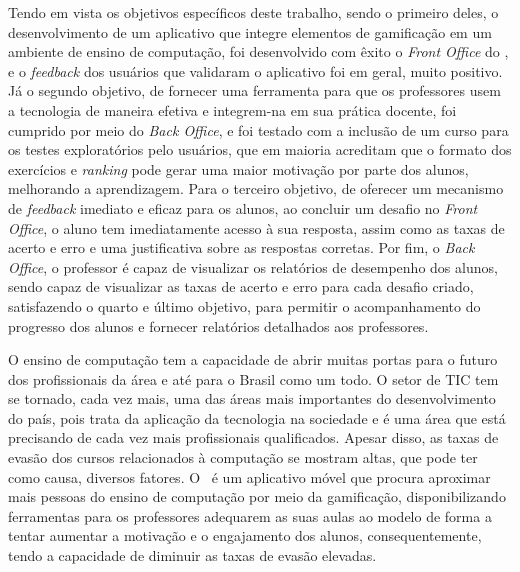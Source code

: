 Tendo em vista os objetivos específicos deste trabalho, sendo o primeiro deles, o desenvolvimento de um aplicativo que integre elementos de gamificação em um ambiente de ensino de computação, foi desenvolvido com êxito o \textit{Front Office} do \appName, e o \textit{feedback} dos usuários que validaram o aplicativo foi em geral, muito positivo. Já o segundo objetivo, de fornecer uma ferramenta para que os professores usem a tecnologia de maneira efetiva e integrem-na em sua prática docente, foi cumprido por meio do \textit{Back Office}, e foi testado com a inclusão de um curso para os testes exploratórios pelo usuários, que em maioria acreditam que o formato dos exercícios e \textit{ranking} pode gerar uma maior motivação por parte dos alunos, melhorando a aprendizagem. Para o terceiro objetivo, de oferecer um mecanismo de \textit{feedback} imediato e eficaz para os alunos, ao concluir um desafio no \textit{Front Office}, o aluno tem imediatamente acesso à sua resposta, assim como as taxas de acerto e erro e uma justificativa sobre as respostas corretas. Por fim, o \textit{Back Office}, o professor é capaz de visualizar os relatórios de desempenho dos alunos, sendo capaz de visualizar as taxas de acerto e erro para cada desafio criado, satisfazendo o quarto e último objetivo, para permitir o acompanhamento do progresso dos alunos e fornecer relatórios detalhados aos professores. 

O ensino de computação tem a capacidade de abrir muitas portas para o futuro dos profissionais da área e até para o Brasil como um todo. O setor de TIC tem se tornado, cada vez mais, uma das áreas mais importantes do desenvolvimento do país, pois trata da aplicação da tecnologia na sociedade e é uma área que está precisando de cada vez mais profissionais qualificados. Apesar disso, as taxas de evasão dos cursos relacionados à computação se mostram altas, que pode ter como causa, diversos fatores. O \appName\ é um aplicativo móvel que procura aproximar mais pessoas do ensino de computação por meio da gamificação, disponibilizando ferramentas para os professores adequarem as suas aulas ao modelo de forma a tentar aumentar a motivação e o engajamento dos alunos, consequentemente, tendo a capacidade de diminuir as taxas de evasão elevadas.

